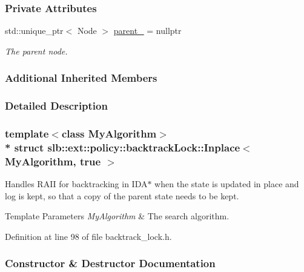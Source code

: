 \subsubsection*{Private Attributes}
\begin{DoxyCompactItemize}
\item 
std\+::unique\+\_\+ptr$<$ Node $>$ \hyperlink{structslb_1_1ext_1_1policy_1_1backtrackLock_1_1Inplace_3_01MyAlgorithm_00_01true_01_4_a3e518436193db41ea16c569828afa795}{parent\+\_\+} = nullptr\hypertarget{structslb_1_1ext_1_1policy_1_1backtrackLock_1_1Inplace_3_01MyAlgorithm_00_01true_01_4_a3e518436193db41ea16c569828afa795}{}\label{structslb_1_1ext_1_1policy_1_1backtrackLock_1_1Inplace_3_01MyAlgorithm_00_01true_01_4_a3e518436193db41ea16c569828afa795}

\begin{DoxyCompactList}\small\item\em The parent node. \end{DoxyCompactList}\end{DoxyCompactItemize}
\subsubsection*{Additional Inherited Members}


\subsubsection{Detailed Description}
\subsubsection*{template$<$class My\+Algorithm$>$\\*
struct slb\+::ext\+::policy\+::backtrack\+Lock\+::\+Inplace$<$ My\+Algorithm, true $>$}

Handles R\+A\+II for backtracking in I\+D\+A$\ast$ when the state is updated in place and log is kept, so that a copy of the parent state needs to be kept. 


\begin{DoxyTemplParams}{Template Parameters}
{\em My\+Algorithm} & The search algorithm. \\
\hline
\end{DoxyTemplParams}


Definition at line 98 of file backtrack\+\_\+lock.\+h.



\subsubsection{Constructor \& Destructor Documentation}
